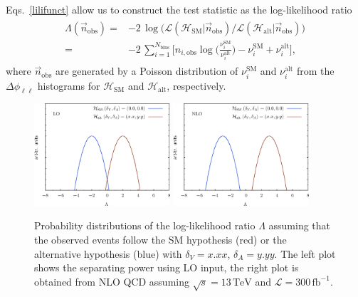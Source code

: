 \documentclass[preprint]{JHEP3} %
\newcommand{\mrm}{\mathrm}
\newcommand{\TeV}{\mathrm{TeV}}
\newcommand{\SM}{\mathrm{SM}}
\newcommand{\alt}{\mathrm{alt}}
\def\invfb {\mathrm{fb}^{-1}}
\def\HSM{\mathcal{H}_{\mathrm{SM}}}
\def\Halt{\mathcal{H}_{\mathrm{alt}}}
\newcommand{\be}{\begin{eqnarray}}
\newcommand{\ee}{\end{eqnarray}}
\begin{document}
Eqs.~\ref{lilifunct} allow us to construct the test statistic as the log-likelihood ratio
\be
\begin{split}
  \Lambda(\vec{n}_\mathrm{obs}) =& -2 \, \log \biggl( \mathcal{L}(\HSM |\vec{n}_\mathrm{obs})  \big/ \mathcal{L}(\Halt|\vec{n}_\mathrm{obs})  \biggr)  \\
                                =& -2\, \sum_{i=1}^{N_\mathrm{bins}} \biggl[ n_{i,\mathrm{obs}}\log \biggl( \frac{\nu_i^{\SM}}{\nu_i^{\alt}} \biggr) -\nu_i^{\SM} + \nu_i^{\alt} \biggr],
\end{split}
\ee
where $\vec{n}_{\mrm{obs}}$ are generated by a Poisson distribution of $\nu_i^{\SM}$ and $\nu_i^{\alt}$
from the $\Delta \phi_{\ell\ell}$ histograms for $\HSM$ and $\Halt$, respectively.
\begin{figure}[t]
\centering %
\includegraphics[width=0.45\textwidth]{./LogLikelihoods_LO.eps}
\hfill
\includegraphics[width=0.45\textwidth]{./LogLikelihoods_NLO.eps}\caption{\label{fig:vi}
Probability distributions of the log-likelihood ratio $\Lambda$ assuming that the observed events follow the SM hypothesis (red) or the alternative hypothesis (blue) 
with $\delta_V=x.xx$, $\delta_A=y.yy$. The left plot shows the separating power using LO input, 
the right plot is obtained from NLO QCD assuming $\sqrt{s}=13\,\TeV$ and $\mathcal{L}=300\,\invfb$.
}
\end{figure}
\end{document}
